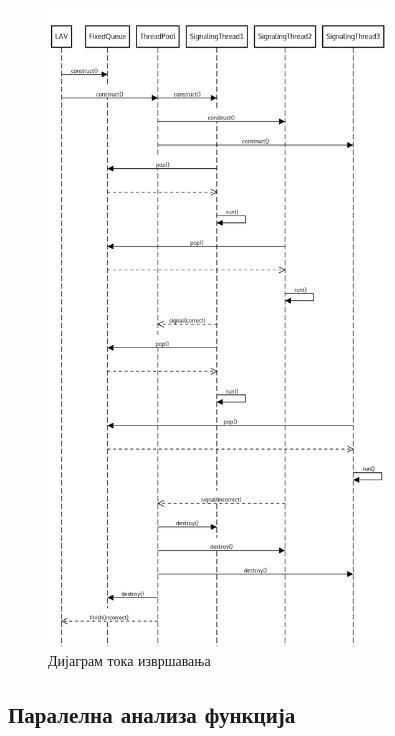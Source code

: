 \documentclass[12pt,oneside]{memoir}
\begin{document}
\begin{figure}[!ht]
  \centering
  \includegraphics[width=0.8\textwidth]{seq_diag.png}
  \caption{Дијаграм тока извршавања}
  \label{fig:sekv_dij}
\end{figure}

\subsection{Паралелна анализа функција}
\end{document}
